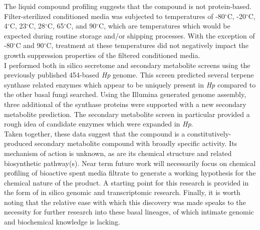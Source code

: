 \indent The liquid compound profiling suggests that the compound is not protein-based. Filter-sterilized conditioned media was subjected to temperatures of -80$^{\circ}$C, -20$^{\circ}$C, 4$^{\circ}$C, 23$^{\circ}$C, 28$^{\circ}$C, 65$^{\circ}$C, and 90$^{\circ}$C, which are temperatures which would be expected during routine storage and/or shipping processes. With the exception of -80$^{\circ}$C and 90$^{\circ}$C, treatment at these temperatures did not negatively impact the growth suppression properties of the filtered conditioned media.\\
\indent I performed both in silico secretome and secondary metabolite screens using the previously published 454-based \textit{Hp} genome. This screen predicted several terpene synthase related enzymes which appear to be uniquely present in \textit{Hp} compared to the other basal fungi searched. Using the Illumina generated genome assembly, three additional of the synthase proteins were supported with a new secondary metabolite prediction. The secondary metabolite screen in particular provided a rough idea of candidate enzymes which were expanded in \textit{Hp}.\\
\indent Taken together, these data suggest that the compound is a constitutively-produced secondary metabolite compound with broadly specific activity. Its mechanism of action is unknown, as are its chemical structure and related biosynthetic pathway(s). Near term future work will necessarily focus on chemical profiling of bioactive spent media filtrate to generate a working hypothesis for the chemical nature of the product. A starting point for this research is provided in the form of in silico genomic and transcriptomic research. Finally, it is worth noting that the relative ease with which this discovery was made speaks to the necessity for further research into these basal lineages, of which intimate genomic and biochemical knowledge is lacking.
